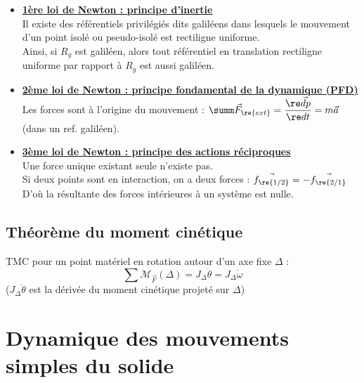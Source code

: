 \documentclass[13pt, twoside, a4paper, french]{report}
\begin{document}
            \begin{itemize}
                \item \underline{\textbf{1ère loi de Newton : principe d’inertie}}\\
                Il existe des référentiels privilégiés dits galiléens dans lesquels le mouvement d'un point isolé ou pseudo-isolé est rectiligne uniforme.\\
                Ainsi, si $R_g$ est galiléen, alors tout référentiel en translation rectiligne uniforme par rapport à $R_g$ est aussi galiléen.\\
                
                \item \underline{\textbf{2ème loi de Newton : principe fondamental de la dynamique (PFD)}}\\
                Les forces sont à l’origine du mouvement : $\summ \vec F_\re{ext} = \dfrac{\re \vec d p}{\re d t} = m \vec a$ (dans un ref. galiléen).\\
                
                \item \underline{\textbf{3ème loi de Newton : principe des actions réciproques}}\\
                Une force unique existant seule n'existe pas.\\
                Si deux points sont en interaction, on a deux forces : $\vec{f_\re{1/2}} = - \vec{f_\re{2/1}}$\\
                D'où la résultante des forces intérieures à un système est nulle.
            \end{itemize}
        
        \subsection{Théorème du moment cinétique}\label{subsec:theoreme-du-moment-cinetique}
            
            TMC pour un point matériel en rotation autour d'un axe fixe $\Delta$ :
            \[\sum \mathcal{M}_{\vec F} (\Delta) = J_\Delta \ddot \theta = J_\Delta \dot \omega \]
            ($J_\Delta \ddot \theta$ est la dérivée du moment cinétique projeté sur $\Delta$)\\
    
    
    \section{Dynamique des mouvements simples du solide}\label{sec:dynamique-des-mouvements-simples-du-solide}
        
\end{document}
